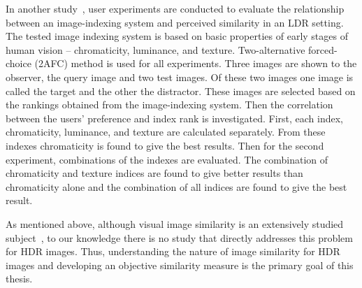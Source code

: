 In another study~\cite{neumann2006image}, user experiments are conducted to evaluate the relationship between an image-indexing system and perceived similarity in an LDR setting. The tested image indexing system is based on basic properties of early stages of human vision -- chromaticity, luminance, and texture. Two-alternative forced-choice (2AFC) method is used for all experiments. Three images are shown to the observer, the query image and two test images. Of these two images one image is called the target and the other the distractor. These images are selected based on the rankings obtained from the image-indexing system. Then the correlation between the users' preference and index rank is investigated. First, each index, chromaticity, luminance, and texture are calculated separately. From these indexes chromaticity is found to give the best results. Then for the second experiment, combinations of the indexes are evaluated. The combination of chromaticity and texture indices are found to give better results than chromaticity alone and the combination of all indices are found to give the best result.

As mentioned above, although visual image similarity is an extensively studied subject~\cite{liu2007survey}, to our knowledge there is no study that directly addresses this problem for HDR images. Thus, understanding the nature of image similarity for HDR images and developing an objective similarity measure is the primary goal of this thesis. 